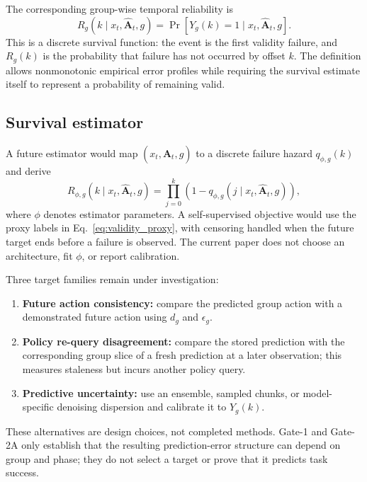 The corresponding group-wise temporal reliability is
\begin{equation}
R_g(k\mid x_t,\widehat{\mathbf A}_t,g)
 = \Pr\!\left[Y_g(k)=1\mid x_t,\widehat{\mathbf A}_t,g\right].
\label{eq:reliability}
\end{equation}
This is a discrete survival function: the event is the first validity failure,
and $R_g(k)$ is the probability that failure has not occurred by offset $k$.
The definition allows nonmonotonic empirical error profiles while requiring the
survival estimate itself to represent a probability of remaining valid.

\subsection{Survival estimator}

A future estimator would map $(x_t,\widehat{\mathbf A}_t,g)$ to a discrete
failure hazard $q_{\phi,g}(k)$ and derive
\begin{equation}
R_{\phi,g}(k\mid x_t,\widehat{\mathbf A}_t,g)
 =\prod_{j=0}^{k}\left(1-q_{\phi,g}(j\mid x_t,\widehat{\mathbf A}_t,g)\right),
\label{eq:survival_estimator}
\end{equation}
where $\phi$ denotes estimator parameters.  A self-supervised objective would
use the proxy labels in Eq.~\ref{eq:validity_proxy}, with censoring handled when
the future target ends before a failure is observed.  The current paper does not
choose an architecture, fit $\phi$, or report calibration.

Three target families remain under investigation:
\begin{enumerate}
    \item \textbf{Future action consistency:} compare the predicted group
    action with a demonstrated future action using $d_g$ and $\epsilon_g$.
    \item \textbf{Policy re-query disagreement:} compare the stored prediction
    with the corresponding group slice of a fresh prediction at a later
    observation; this measures staleness but incurs another policy query.
    \item \textbf{Predictive uncertainty:} use an ensemble, sampled chunks, or
    model-specific denoising dispersion and calibrate it to $Y_g(k)$.
\end{enumerate}
These alternatives are design choices, not completed methods.  Gate-1 and
Gate-2A only establish that the resulting prediction-error structure can depend
on group and phase; they do not select a target or prove that it predicts task
success.

